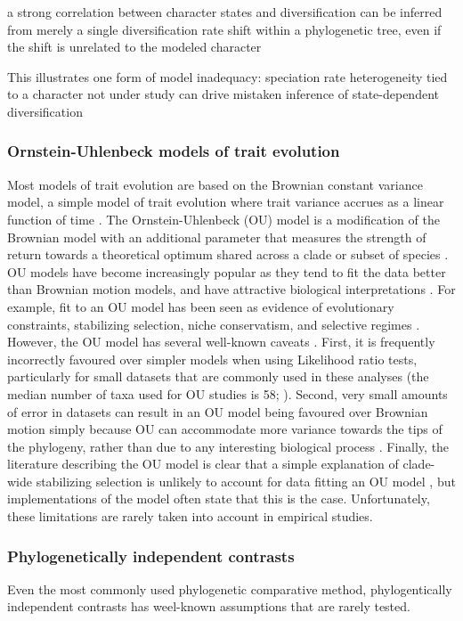 \documentclass[a4paper,12pt]{article}
\begin{document}
a strong correlation
between character states and diversification can be
inferred from merely a single diversification rate
shift within a phylogenetic tree, even if the shift is
unrelated to the modeled character

This illustrates one
form of model inadequacy: speciation rate heterogeneity
tied to a character not under study can drive
mistaken inference of state-dependent diversification

\subsubsection{Ornstein-Uhlenbeck models of trait evolution}
Most models of trait evolution are based on the Brownian constant variance model, a simple model of trait evolution where trait variance accrues as a linear function of time \citep{cavalli1967,felsenstein1973maximum}.
The Ornstein-Uhlenbeck (OU) model is a modification of the Brownian model with an additional parameter that measures the strength of return towards a theoretical optimum shared across a clade or subset of species \citep{Butler:2004aa,hansen1997stabilizing}.
OU models have become increasingly popular as they tend to fit the data better than Brownian motion models, and have attractive biological interpretations \citep{cooper2016}.
For example, fit to an OU model has been seen as evidence of evolutionary constraints, stabilizing selection, niche conservatism, and selective regimes \citep{}.
However, the OU model has several well-known caveats \citep[see][]{ho2013asymptotic,ho2014intrinsic,boettiger2012your}. 
First, it is frequently incorrectly favoured over simpler models when using Likelihood ratio tests, particularly for small datasets that are commonly used in these analyses (the median number of taxa used for OU studies is 58; \citealp{cooper2016}). 
Second, very small amounts of error in datasets can result in an OU model being favoured over Brownian motion simply because OU can accommodate more variance towards the tips of the phylogeny, rather than due to any interesting biological process \citep{boettiger2012your,pennell2015model}.
Finally, the literature describing the OU model is clear that a simple explanation of clade-wide stabilizing selection is unlikely to account for data fitting an OU model \citep[e.g.][]{hansen1997stabilizing,hansen2005assessing}, but implementations of the model often state that this is the case.
Unfortunately, these limitations are rarely taken into account in empirical studies.

\subsubsection{Phylogenetically independent contrasts} %
Even the most commonly used phylogenetic comparative method, phylogentically independent contrasts has weel-known assumptions that are rarely tested.
\end{document}
